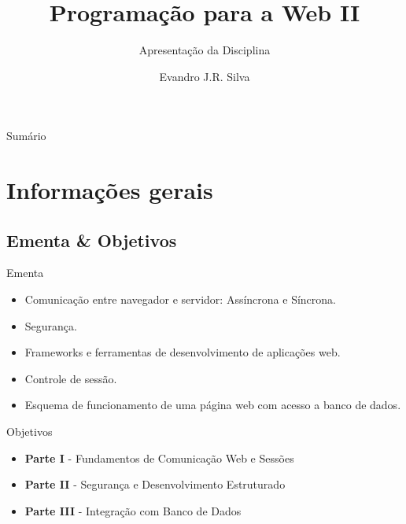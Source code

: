 \documentclass{beamer}
\title[AP 00]{Programação para a Web II}
\subtitle{Apresentação da Disciplina}
\author[E.J.R. Silva]{Evandro J.R. Silva}
\date{}
\begin{document}
    
\begin{frame}
    \titlepage
\end{frame}

\begin{frame}{Sumário}
    \tableofcontents
\end{frame}

\section{Informações gerais}

\subsection{Ementa \& Objetivos}

\begin{frame}{Ementa}
    \begin{itemize}
        \justifying
        \item Comunicação entre navegador e servidor: Assíncrona e Síncrona.
        \item Segurança.
        \item Frameworks e ferramentas de desenvolvimento de aplicações web.
        \item Controle de sessão.
        \item Esquema de funcionamento de uma página web com acesso a banco de dados.
    \end{itemize}
\end{frame}

\begin{frame}{Objetivos}
    \begin{itemize}
        \justifying
        \item \textbf{Parte I} - Fundamentos de Comunicação Web e Sessões
        \item \textbf{Parte II} - Segurança e Desenvolvimento Estruturado
        \item \textbf{Parte III} - Integração com Banco de Dados
    \end{itemize}
\end{frame}
\end{document}
